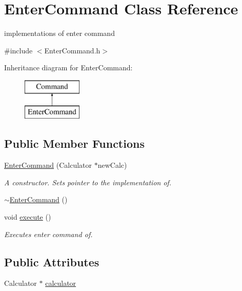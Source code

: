 \hypertarget{class_enter_command}{}\section{Enter\+Command Class Reference}
\label{class_enter_command}


implementations of enter command  




{\ttfamily \#include $<$Enter\+Command.\+h$>$}

Inheritance diagram for Enter\+Command\+:\begin{figure}[H]
\begin{center}
\leavevmode
\includegraphics[height=2.000000cm]{class_enter_command}
\end{center}
\end{figure}
\subsection*{Public Member Functions}
\begin{DoxyCompactItemize}
\item 
\hyperlink{class_enter_command_aa582c411b3919835a7ff06ec5f089a66}{Enter\+Command} (Calculator $\ast$new\+Calc)
\begin{DoxyCompactList}\small\item\em A constructor. Sets pointer to the implementation of. \end{DoxyCompactList}\item 
\hyperlink{class_enter_command_a9eaab904e5bb6c0128e585cfa983b463}{$\sim$\+Enter\+Command} ()
\item 
void \hyperlink{class_enter_command_ae8701c3ea3682f566dfbcd3415a767f8}{execute} ()
\begin{DoxyCompactList}\small\item\em Executes enter command of. \end{DoxyCompactList}\end{DoxyCompactItemize}
\subsection*{Public Attributes}
\begin{DoxyCompactItemize}
\item 
Calculator $\ast$ \hyperlink{class_enter_command_a565ba3ebfd7b06dcd5fd30baa806f798}{calculator}
\end{DoxyCompactItemize}


